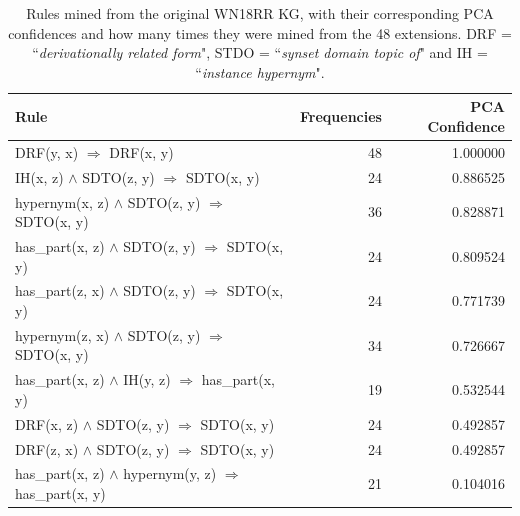 \label{Rule_comparison}
\begin{table}[htbp]
\begin{tabular}{lrr}
\toprule
                                                                                                      Rule &  Frequencies &  PCA Confidence \\
\midrule
                            DRF(y, x)   $\Rightarrow$ DRF(x, y) &           48 &        1.000000 \\
          IH(x, z) $\wedge$ SDTO(z, y)   $\Rightarrow$ SDTO(x, y) &           24 &        0.886525 \\
                   hypernym(x, z) $\wedge$ SDTO(z, y)   $\Rightarrow$ SDTO(x, y) &           36 &        0.828871 \\
                   has\_part(x, z) $\wedge$ SDTO(z, y)   $\Rightarrow$ SDTO(x, y) &           24 &        0.809524 \\
                   has\_part(z, x) $\wedge$ SDTO(z, y)   $\Rightarrow$ SDTO(x, y) &           24 &        0.771739 \\
                   hypernym(z, x) $\wedge$ SDTO(z, y)   $\Rightarrow$ SDTO(x, y) &           34 &        0.726667 \\
                                      has\_part(x, z) $\wedge$ IH(y, z)   $\Rightarrow$ has\_part(x, y) &           19 &        0.532544 \\
DRF(x, z) $\wedge$ SDTO(z, y)   $\Rightarrow$ SDTO(x, y) &           24 &        0.492857 \\
DRF(z, x) $\wedge$ SDTO(z, y)   $\Rightarrow$ SDTO(x, y) &           24 &        0.492857 \\
                                               has\_part(x, z) $\wedge$ hypernym(y, z)   $\Rightarrow$ has\_part(x, y) &           21 &        0.104016 \\
\bottomrule
\end{tabular}
\caption[Rules mined from the original WN18RR KG]{Rules mined from the original WN18RR KG, with their corresponding PCA confidences and how many times they were mined from the 48 extensions. DRF = ``\textit{derivationally related form}", STDO = ``\textit{synset domain topic of}" and IH = ``\textit{instance hypernym}".}
\label{wn18rr_original_rules_table_PCA}
\end{table}



